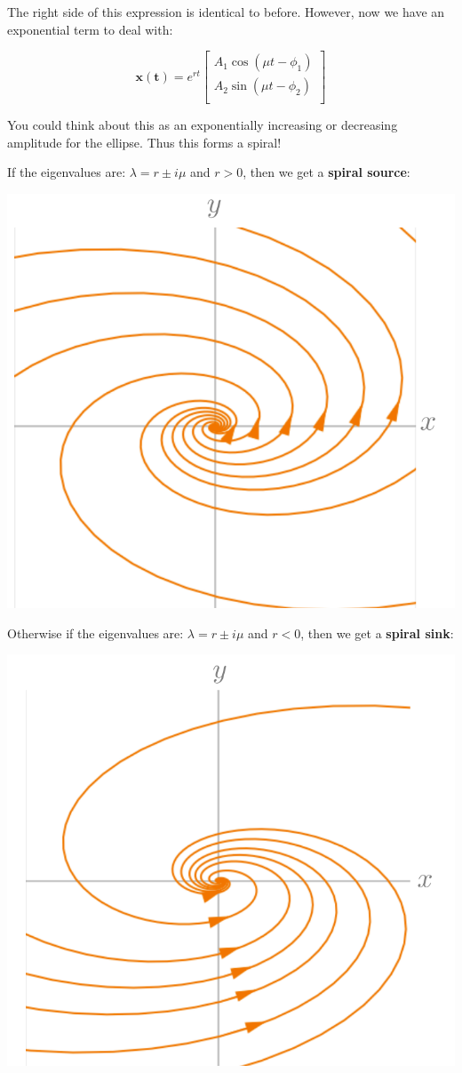 \documentclass{report}
\begin{document}
The right side of this expression is identical to before. However, now we have an exponential term to deal with:


$$
\mathbf{x(t)} = 
e^{rt}
\begin{bmatrix}
    A_1\cos(\mu t - \phi_1) \\ 
    A_2\sin(\mu t - \phi_2) \\
\end{bmatrix}
$$

You could think about this as an exponentially increasing or decreasing amplitude for the ellipse. Thus this forms a spiral!

If the eigenvalues are:
$\lambda = r \pm i\mu$ and $r>0$, then we get a \textbf{spiral source}:

\includegraphics[scale=0.3]{spiral_source.png}


Otherwise if the eigenvalues are:
$\lambda = r \pm i\mu$ and $r<0$, then we get a \textbf{spiral sink}:

\includegraphics[scale=0.3]{spiral_sink.png}
\end{document}
